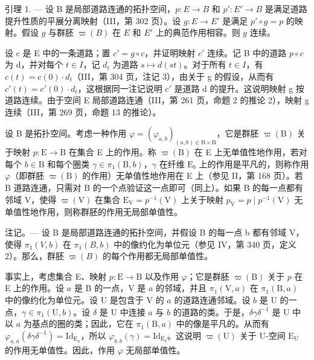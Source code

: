 引理 1. --- 设 B 是局部道路连通的拓扑空间，\(p \colon E \to B\) 和 \(p' \colon E' \to B\) 是满足道路提升性质的平展分离映射（III，第 302 页）。设 \(g \colon E \to E'\) 是满足 \(p' \circ g = p\) 的映射。假设 \(g\) 与群胚 \(\varpi(B)\) 在 \(E\) 和 \(E'\) 上的典范作用相容。则 \(g\) 连续。

设 c 是 E 中的一条道路；置 \(c' = g \circ c\)，并证明映射 \(c'\) 连续。记 B 中的道路 \(p \circ c\) 为 d，并对每个 \(t \in I\)，记 \(d_t\) 为道路 \(s \mapsto d(st)\)。对于所有 \(t \in I\)，有 \(c(t) = c(0) \cdot d_t\)（III，第 304 页，注记 3），由关于 g 的假设，从而有 \(c'(t) = c'(0) \cdot d_t\)，这根据同一注记说明 \(c'\) 是道路 d 的提升。这说明映射 g 按道路连续。由于空间 E 局部道路连通（III，第 261 页，命题 2 的推论 2），映射 g 连续（III，第 269 页，命题 13 的推论）。

设 B 是拓扑空间。考虑一种作用 \(\varphi = (\varphi_{a,b})_{(a,b)\in \mathrm{B}\times \mathrm{B}}\)，它是群胚 \(\varpi (\mathrm{B})\) 关于映射 \(p\colon \mathrm{E}\to \mathrm{B}\) 在集合 E 上的作用。称 \(\varpi (\mathrm{B})\) 在 E 上无单值性地作用，若对每个 \(b\in \mathrm{B}\) 和每个圈类 \(\gamma \in \pi_1(\mathrm{B},b)\)，\(\gamma\) 在纤维 \(\mathrm{E}_b\) 上的作用是平凡的，则称作用 \(\varphi\)（即群胚 \(\varpi (\mathrm{B})\) 的作用）无单值性地作用在 E 上（参见 II，第 168 页）。若 B 道路连通，只需对 B 的一个点验证这一点即可（同上）。如果 B 的每一点都有邻域 V，使得 \(\varpi (\mathrm{V})\) 在集合 \(\mathrm{E_V} = p^{-1}(\mathrm{V})\) 上关于映射 \(p_{\mathrm{V}} = p\mid p^{-1}(\mathrm{V})\) 无单值性地作用，则称群胚的作用无局部单值性。

注记。--- 设 B 是局部道路连通的拓扑空间，并假设 B 的每一点 b 都有邻域 V，使得 \(\pi_{1}(V,b)\) 在 \(\pi_{1}(B,b)\) 中的像约化为单位元（参见 IV，第 340 页，定义 2）。那么，群胚 \(\varpi(B)\) 的每个作用都无局部单值性。

事实上，考虑集合 E、映射 \(p \colon \mathrm{E} \to \mathrm{B}\) 以及作用 \(\varphi\)；它是群胚 \(\varpi(\mathrm{B})\) 关于 \(p\) 在 E 上的作用。设 \(a\) 是 B 的一点，V 是 \(a\) 的邻域，并且 \(\pi_1(\mathrm{V}, a)\) 在 \(\pi_1(\mathrm{B}, a)\) 中的像约化为单位元。设 U 是包含于 V 的 \(a\) 的道路连通邻域。设 \(b\) 是 U 的一点，\(\gamma \in \pi_1(\mathrm{U}, b)\)。设 \(\delta\) 是 U 中连接 \(a\) 与 \(b\) 的道路的类。于是，\(\delta\gamma\delta^{-1}\) 是 U 中以 \(a\) 为基点的圈的类；因此，它在 \(\pi_1(\mathrm{B}, a)\) 中的像是平凡的。从而有 \(\varphi_{a,a}(\delta\gamma\delta^{-1}) = \mathrm{Id}_{\mathrm{E}_a}\)，所以 \(\varphi_{b,b}(\gamma) = \mathrm{Id}_{\mathrm{E}_b}\)。这说明 \(\varpi(\mathrm{U})\) 关于 U-空间 \(\mathrm{E_U}\) 的作用无单值性。因此，作用 \(\varphi\) 无局部单值性。

